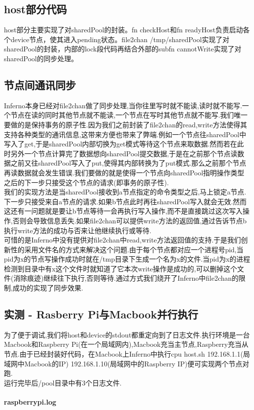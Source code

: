 \documentclass[paper=a4]{ctexart} %
\numberwithin{equation}{section} %
\numberwithin{figure}{section} %
\numberwithin{table}{section} %
\newcommand{\n}{\\\indent}
\begin{document}
\subsection{host部分代码}
host部分主要实现了对sharedPool的封装。fn checkHost和fn readyHost负责启动各个device节点，使其进入pending状态。file2chan /tmp/sharedPool实现了对sharedPool的封装，内部的lock段代码再结合外部的subfn cannotWrite实现了对sharedPool的同步处理。

\subsection{节点间通讯同步}
Inferno本身已经对file2chan做了同步处理,当你往里写时就不能读,读时就不能写.一个节点在读的同时其他节点就不能读,一个节点在写时其他节点就不能写.我们唯一要做的是保持事务的原子性.因为我们之前封装了file2chan的read,write方法使得其支持各种类型的通讯信息,这带来方便也带来了弊端.例如一个节点往sharedPool中写入了get,于是sharedPool内部切换为get模式等待这个节点来取数据.然而若在此时另外一个节点计算完了数据想向sharedPool提交数据,于是在之前那个节点读数据之前又往sharedPool写入了put,使得其内部转换为了put模式.那么之前那个节点再读数据就会发生错误.我们要做的就是使得一个节点向sharedPool指明操作类型之后的下一步只接受这个节点的请求(即事务的原子性). \n
我们的实现方法是当sharedPool接收到a节点指定的命令类型之后,马上锁定a节点.下一步只接受来自a节点的请求.如果b节点此时再往sharedPool写入就会无效.然而这还有一问题就是要让b节点等待一会再执行写入操作,而不是直接跳过这次写入操作,否则会导致信息丢失.如果file2chan可以提供write方法的返回值,通过告诉节点b执行write方法的成功与否来让他继续执行或等待.\n
可惜的是Inferno中没有提供对file2chan中read,write方法返回值的支持.于是我们创新性的采用文件名的方式来解决这个问题.由于每个节点都对应一个进程号pid,当pid为x的节点写操作成功时就在/tmp目录下生成一个名为x的文件.当pid为x的进程检测到目录中有x这个文件时就知道了它本次write操作是成功的,可以删掉这个文件(消除痕迹)继续往下执行,否则等待.通过方式我们绕开了Inferno中file2chan的限制,成功的实现了同步效果.

\subsection{实测 - Rasberry Pi与Macbook并行执行}
为了便于调试,我们将host和device的stdout都重定向到了日志文件.执行环境是一台Macbook和Raspberry Pi(在一个局域网内),Macbook充当主节点,Raspberry充当从节点.由于已经封装好代码，在Macbook上Inferno中执行cpu host.sh 192.168.1.1(局域网中Macbook的IP) 192.168.1.10(局域网中的Raspberry IP)便可实现两个节点对跑. \n
运行完毕后/pool目录中有3个日志文件.\n
\paragraph{raspberrypi.log}

\end{document}
